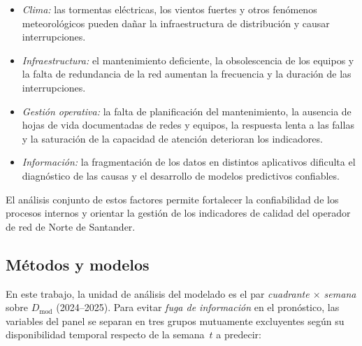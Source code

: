 \begin{enumerate}
            \begin{itemize}
                \item \textit{Clima:} las tormentas eléctricas, los vientos fuertes y otros fenómenos meteorológicos pueden dañar la infraestructura de distribución y causar interrupciones.
                \item \textit{Infraestructura:} el mantenimiento deficiente, la obsolescencia de los equipos y la falta de redundancia de la red aumentan la frecuencia y la duración de las interrupciones.
                \item \textit{Gestión operativa:} la falta de planificación del mantenimiento, la ausencia de hojas de vida documentadas de redes y equipos, la respuesta lenta a las fallas y la saturación de la capacidad de atención deterioran los indicadores.
                \item \textit{Información:} la fragmentación de los datos en distintos aplicativos dificulta el diagnóstico de las causas y el desarrollo de modelos predictivos confiables.
            \end{itemize}

        El análisis conjunto de estos factores permite fortalecer la confiabilidad de los procesos internos y orientar la gestión de los indicadores de calidad del operador de red de Norte de Santander.
    
     \end{enumerate}

\subsection{Métodos y modelos}
\label{sec:metodos-modelos}

En este trabajo, la unidad de análisis del modelado es el par \textit{cuadrante $\times$ semana} sobre $D_{\mathrm{mod}}$ (2024--2025). Para evitar \textit{fuga de información} en el pronóstico, las variables del panel se separan en tres grupos mutuamente excluyentes según su disponibilidad temporal respecto de la semana~$t$ a predecir:

